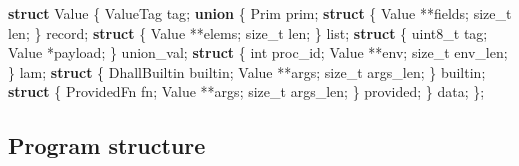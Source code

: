 \documentclass[]{article}
\newenvironment{Shaded}{}{}
\newcommand{\DataTypeTok}[1]{\textcolor[rgb]{0.56,0.13,0.00}{#1}}
\newcommand{\KeywordTok}[1]{\textcolor[rgb]{0.00,0.44,0.13}{\textbf{#1}}}
\newcommand{\NormalTok}[1]{#1}
\newcommand{\OperatorTok}[1]{\textcolor[rgb]{0.40,0.40,0.40}{#1}}
\begin{document}
\begin{Shaded}
\begin{Highlighting}[]
\KeywordTok{struct}\NormalTok{ Value }\OperatorTok{\{}
\NormalTok{  ValueTag tag}\OperatorTok{;}
  \KeywordTok{union} \OperatorTok{\{}
\NormalTok{    Prim prim}\OperatorTok{;}
    \KeywordTok{struct} \OperatorTok{\{}\NormalTok{ Value }\OperatorTok{**}\NormalTok{fields}\OperatorTok{;} \DataTypeTok{size\_t}\NormalTok{ len}\OperatorTok{;} \OperatorTok{\}}\NormalTok{ record}\OperatorTok{;}
    \KeywordTok{struct} \OperatorTok{\{}\NormalTok{ Value }\OperatorTok{**}\NormalTok{elems}\OperatorTok{;} \DataTypeTok{size\_t}\NormalTok{ len}\OperatorTok{;} \OperatorTok{\}}\NormalTok{ list}\OperatorTok{;}
    \KeywordTok{struct} \OperatorTok{\{} \DataTypeTok{uint8\_t}\NormalTok{ tag}\OperatorTok{;}\NormalTok{ Value }\OperatorTok{*}\NormalTok{payload}\OperatorTok{;} \OperatorTok{\}}\NormalTok{ union\_val}\OperatorTok{;}
    \KeywordTok{struct} \OperatorTok{\{} \DataTypeTok{int}\NormalTok{ proc\_id}\OperatorTok{;}\NormalTok{ Value }\OperatorTok{**}\NormalTok{env}\OperatorTok{;} \DataTypeTok{size\_t}\NormalTok{ env\_len}\OperatorTok{;} \OperatorTok{\}}\NormalTok{ lam}\OperatorTok{;}
    \KeywordTok{struct} \OperatorTok{\{}\NormalTok{ DhallBuiltin builtin}\OperatorTok{;}\NormalTok{ Value }\OperatorTok{**}\NormalTok{args}\OperatorTok{;} \DataTypeTok{size\_t}\NormalTok{ args\_len}\OperatorTok{;} \OperatorTok{\}}\NormalTok{ builtin}\OperatorTok{;}
    \KeywordTok{struct} \OperatorTok{\{}\NormalTok{ ProvidedFn fn}\OperatorTok{;}\NormalTok{ Value }\OperatorTok{**}\NormalTok{args}\OperatorTok{;} \DataTypeTok{size\_t}\NormalTok{ args\_len}\OperatorTok{;} \OperatorTok{\}}\NormalTok{ provided}\OperatorTok{;}
  \OperatorTok{\}}\NormalTok{ data}\OperatorTok{;}
\OperatorTok{\};}
\end{Highlighting}
\end{Shaded}

\subsection{Program structure}\label{program-structure}
\end{document}
